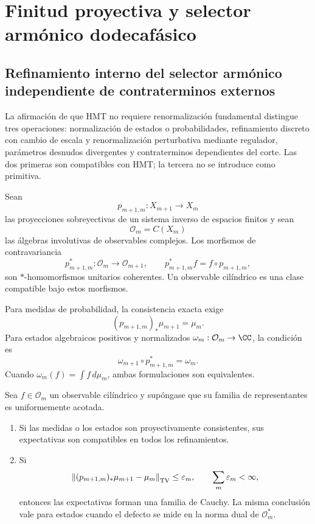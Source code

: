 \chapter{Finitud proyectiva y selector armónico dodecafásico}
\label{chap:finitud-anisotropia}

\section{Refinamiento interno del selector armónico independiente de contraterminos externos}
\label{sec:refinamiento-sin-contraterminos}

La afirmación de que HMT no requiere renormalización fundamental distingue
tres operaciones: normalización de estados o probabilidades, refinamiento
discreto con cambio de escala y renormalización perturbativa mediante
regulador, parámetros desnudos divergentes y contraterminos dependientes del
corte. Las dos primeras son compatibles con HMT; la tercera no se introduce
como primitiva.

Sean
\[
 p_{m+1,m}:X_{m+1}\longrightarrow X_m
\]
las proyecciones sobreyectivas de un sistema inverso de espacios finitos y
sean
\[
 \mathcal O_m=C(X_m)
\]
las álgebras involutivas de observables complejos. Los morfismos de
contravariancia
\[
 p_{m+1,m}^{\ast}:\mathcal O_m\longrightarrow\mathcal O_{m+1},
 \qquad
 p_{m+1,m}^{\ast}f=f\circ p_{m+1,m},
\]
son \(\ast\)-homomorfismos unitarios coherentes. Un observable cilíndrico es
una clase compatible bajo estos morfismos.

Para medidas de probabilidad, la consistencia exacta exige
\[
 (p_{m+1,m})_\ast\mu_{m+1}=\mu_m.
\]
Para estados algebraicos positivos y normalizados
\(\omega_m:\mathcal O_m\to\CC\), la condición es
\[
 \omega_{m+1}\circ p_{m+1,m}^{\ast}=\omega_m.
\]
Cuando \(\omega_m(f)=\int f\,d\mu_m\), ambas formulaciones son equivalentes.

\begin{theorem}
\label{thm:compatibilidad-proyectiva-defectos}
Sea \(f\in\mathcal O_m\) un observable cilíndrico y supóngase que su familia
de representantes es uniformemente acotada.
\begin{enumerate}
 \item Si las medidas o los estados son proyectivamente consistentes, sus
 expectativas son compatibles en todos los refinamientos.
 \item Si
 \[
 \left\|(p_{m+1,m})_\ast\mu_{m+1}-\mu_m\right\|_{\rm TV}
 \leq\varepsilon_m,\qquad
 \sum_m\varepsilon_m<\infty,
 \]
 entonces las expectativas forman una familia de Cauchy. La misma conclusión
 vale para estados cuando el defecto se mide en la norma dual de
 \(\mathcal O_m^\ast\).
\end{enumerate}
\end{theorem}

